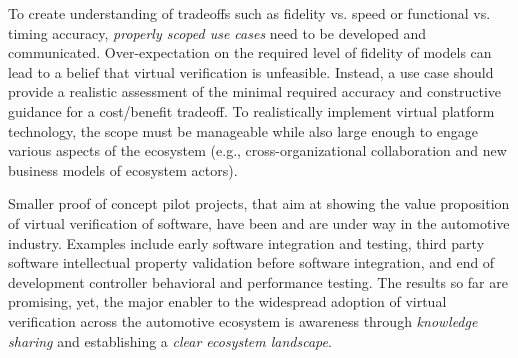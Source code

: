 To create understanding of tradeoffs such as fidelity vs. speed or functional vs. timing accuracy, \emph{properly scoped use cases} need to be developed and communicated.
Over-expectation on the required level of fidelity of models can lead to a belief that virtual verification is unfeasible.
Instead, a use case should provide a realistic assessment of the minimal required accuracy 
and %
constructive guidance for a cost/benefit tradeoff.
To realistically implement virtual platform technology, the scope must be manageable while also large enough to engage various aspects of the ecosystem (e.g., cross-organizational collaboration and new business models of ecosystem actors).


Smaller proof of concept pilot projects, that aim at showing the value proposition of virtual verification of software, have been and are under way in the automotive industry.
Examples include early software integration and testing, third party software intellectual property validation before software integration, and end of development controller behavioral and performance testing.
The results so far are promising, yet, the major enabler to the widespread adoption of virtual verification across the automotive ecosystem is awareness through \emph{knowledge sharing} and establishing a \emph{clear ecosystem landscape}.

